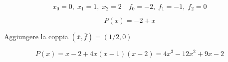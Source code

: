 \[ x_0=0, \; x_1=1, \; x_2=2 \quad f_0=-2, \; f_1=-1, \; f_2=0 \]

\[ P(x)=-2+x \]

\medskip

\noindent Aggiungere la coppia $(\overline{x},\overline{f})=(1/2,0)$

\[ P(x)=x-2+4x(x-1)(x-2)=4x^3-12x^2+9x-2 \]
